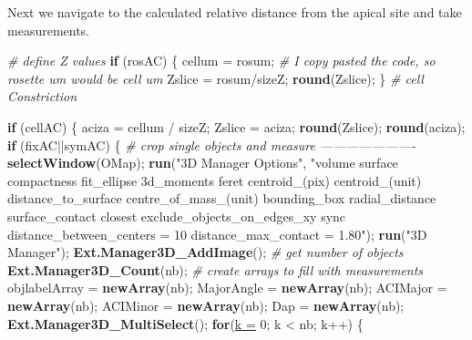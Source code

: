 \documentclass[11pt,singlespacinge,twoside]{reedthesis} %
\newenvironment{Shaded}{}{}
\newcommand{\CommentTok}[1]{\textit{#1}}
\newcommand{\ControlFlowTok}[1]{\textbf{#1}}
\newcommand{\DataTypeTok}[1]{\underline{#1}}
\newcommand{\DecValTok}[1]{#1}
\newcommand{\KeywordTok}[1]{\textbf{#1}}
\newcommand{\NormalTok}[1]{#1}
\newcommand{\OperatorTok}[1]{#1}
\newcommand{\StringTok}[1]{#1}
\theoremstyle{definition}
\theoremstyle{definition}
\theoremstyle{definition}
\theoremstyle{remark}
\begin{document}
Next we navigate to the calculated relative distance from the apical site and take measurements.

\scriptsize
\begin{Shaded}
\begin{Highlighting}[numbers=left,,]
\CommentTok{# define Z values}
    \ControlFlowTok{if}\NormalTok{ (rosAC) \{}
\NormalTok{        cellum =}\StringTok{ }\NormalTok{rosum; }\CommentTok{# I copy pasted the code, so rosette um would be cell um}
\NormalTok{        Zslice =}\StringTok{ }\NormalTok{rosum}\OperatorTok{/}\NormalTok{sizeZ;}
        \KeywordTok{round}\NormalTok{(Zslice);}
\NormalTok{    \}}
\CommentTok{# cell Constriction}

    \ControlFlowTok{if}\NormalTok{ (cellAC) \{}
\NormalTok{        aciza =}\StringTok{ }\NormalTok{cellum }\OperatorTok{/}\StringTok{ }\NormalTok{sizeZ;}
\NormalTok{        Zslice =}\StringTok{ }\NormalTok{aciza;}
        \KeywordTok{round}\NormalTok{(Zslice);}
        \KeywordTok{round}\NormalTok{(aciza);}
        \ControlFlowTok{if}\NormalTok{ (fixAC}\OperatorTok{||}\NormalTok{symAC) \{}
    \CommentTok{# crop single objects and measure ----------------------}
      \KeywordTok{selectWindow}\NormalTok{(OMap);}
        \KeywordTok{run}\NormalTok{(}\StringTok{"3D Manager Options"}\NormalTok{, }\StringTok{"volume surface compactness fit_ellipse 3d_moments }
\StringTok{        feret centroid_(pix) centroid_(unit) distance_to_surface centre_of_mass_(unit) }
\StringTok{        bounding_box radial_distance surface_contact closest exclude_objects_on_edges_xy }
\StringTok{        sync distance_between_centers = 10 distance_max_contact = 1.80"}\NormalTok{);}
        \KeywordTok{run}\NormalTok{(}\StringTok{"3D Manager"}\NormalTok{);}
        \KeywordTok{Ext.Manager3D_AddImage}\NormalTok{();}
    \CommentTok{# get number of objects}
        \KeywordTok{Ext.Manager3D_Count}\NormalTok{(nb);}
    \CommentTok{# create arrays to fill with measurements}
\NormalTok{        objlabelArray =}\StringTok{ }\KeywordTok{newArray}\NormalTok{(nb);}
\NormalTok{        MajorAngle =}\StringTok{ }\KeywordTok{newArray}\NormalTok{(nb);}
\NormalTok{        ACIMajor =}\StringTok{ }\KeywordTok{newArray}\NormalTok{(nb);}
\NormalTok{        ACIMinor =}\StringTok{ }\KeywordTok{newArray}\NormalTok{(nb);}
\NormalTok{        Dap =}\StringTok{ }\KeywordTok{newArray}\NormalTok{(nb);}
        \KeywordTok{Ext.Manager3D_MultiSelect}\NormalTok{();}
        \ControlFlowTok{for}\NormalTok{(}\DataTypeTok{k =} \DecValTok{0}\NormalTok{; k }\OperatorTok{<}\StringTok{ }\NormalTok{nb; k}\OperatorTok{++}\NormalTok{) \{}

\end{Highlighting}
\end{Shaded}
\end{document}
